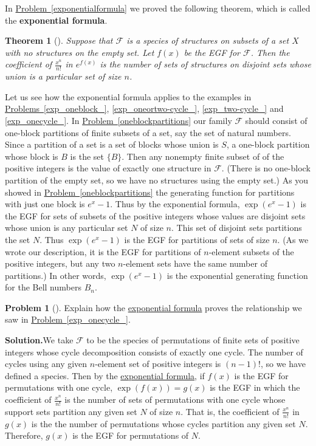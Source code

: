 \documentclass[10pt,]{book}
\newcommand{\terminology}[1]{\textbf{#1}}
\theoremstyle{plain}
\newtheorem{theorem}{Theorem}[section]
\theoremstyle{definition}
\newtheorem{activity}[project]{Problem}
\theoremstyle{definition}
\numberwithin{equation}{chapter}
\newcommand{\F}{\mathcal{F}}
\begin{document}
In \hyperref[exponentialformula]{Problem~\ref{exponentialformula}} we proved the following theorem, which is called the \terminology{exponential formula}.%
\begin{theorem}[{}]\label{exponentialformulathm}
Suppose that \(\F\) is a species of structures on subsets of a set \(X\) with no structures on the empty set. Let \(f(x)\) be the EGF for \(\F\). Then the coefficient of \(\frac{x^n}{n!}\) in \(e^{f(x)}\) is the number of sets of structures on disjoint sets whose union is a particular set of size \(n\).%
\end{theorem}
Let us see how the exponential formula applies to the examples in \hyperref[exp_oneblock_]{Problems~\ref{exp_oneblock_}}, \hyperref[exp_oneortwo-cycle_]{\ref{exp_oneortwo-cycle_}}, \hyperref[exp_two-cycle_]{\ref{exp_two-cycle_}} and \hyperref[exp_onecycle_]{\ref{exp_onecycle_}}. In \hyperref[oneblockpartitions]{Problem~\ref{oneblockpartitions}} our family \(\F\) should consist of one-block partitions of finite subsets of a set, say the set of natural numbers.  Since a partition of a set is a set of blocks whose union is \(S\), a one-block partition whose block is \(B\) is the set \(\{B\}\). Then any nonempty finite subset of of the positive integers is the value of exactly one structure in \(\F\).  (There is no one-block partition of the empty set, so we have no structures using the empty set.) As you showed in \hyperref[oneblockpartitions]{Problem~\ref{oneblockpartitions}} the generating function for partitions with just one block is \(e^x-1\). Thus by the exponential formula, \(\exp(e^x-1)\) is the EGF for sets of subsets of the positive integers whose values are disjoint sets whose union is any particular set \(N\) of size \(n\). This set of disjoint sets partitions the set \(N\). Thus \(\exp(e^x-1)\) is the EGF for partitions of sets of size \(n\). (As we wrote our description, it is the EGF for partitions of \(n\)-element subsets of the positive integers, but any two \(n\)-element sets have the same number of partitions.) In other words, \(\exp(e^x-1)\) is the exponential generating function for the Bell numbers \(B_n\).%
\begin{activity}[]\label{activity-414}
Explain how the \hyperref[exponentialformulathm]{exponential formula} proves the relationship we saw in \hyperref[exp_onecycle_]{Problem~\ref{exp_onecycle_}}.%
\par\medskip\noindent%
\textbf{Solution.}\quad We take \(\F\) to be the species of permutations of finite sets of positive integers whose cycle decomposition consists of exactly one cycle.  The number of cycles using any given \(n\)-element set of positive integers is \((n-1)!\), so we have defined a species. Then by the \hyperref[exponentialformulathm]{exponential formula}, if \(f(x)\) is the EGF for permutations with one cycle, \(\exp(f(x))=g(x)\) is the EGF in which the coefficient of \(\frac{x^n}{n!}\) is the number of sets of  permutations with one cycle whose support sets partition any given set \(N\) of size \(n\). That is, the coefficient of \(\frac{x^n}{n!}\) in \(g(x)\) is the the number of permutations whose cycles partition any given set \(N\).  Therefore, \(g(x)\) is the EGF for permutations of \(N\).%
\end{activity}
\end{document}
